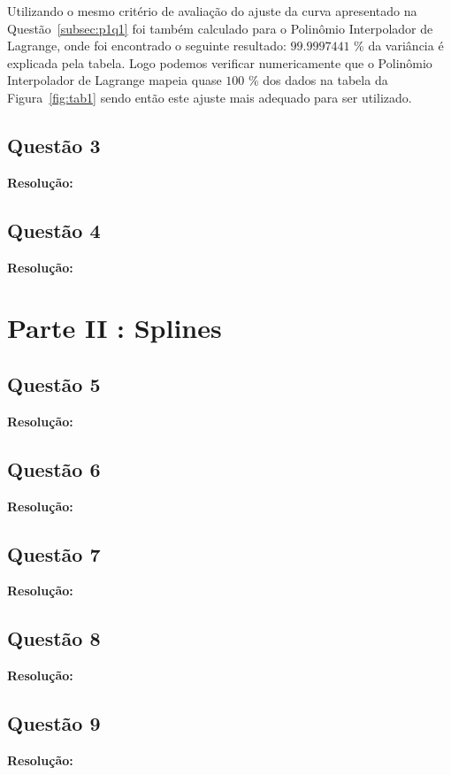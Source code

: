 \documentclass[12pt]{article}
\begin{document}
Utilizando o mesmo critério de avaliação do ajuste da curva apresentado na Questão~\ref{subsec:p1q1} foi também calculado para o Polinômio Interpolador de Lagrange, onde foi encontrado o seguinte resultado: $99.9997441$ \% da variância é explicada pela tabela. Logo podemos verificar numericamente que o Polinômio Interpolador de Lagrange mapeia quase $100$ \% dos dados na tabela da Figura~\ref{fig:tab1} sendo então este ajuste mais adequado para ser utilizado.

\subsection{Questão 3}
\label{subsec:p1q3}

\textbf{Resolução:}

\subsection{Questão 4}
\label{subsec:p1q4}

\textbf{Resolução:}

\section{Parte II : Splines}
\label{sec:parte2}

\subsection{Questão 5}
\label{subsec:p2q5}

\textbf{Resolução:}

\subsection{Questão 6}
\label{subsec:p2q6}

\textbf{Resolução:}

\subsection{Questão 7}
\label{subsec:p2q7}

\textbf{Resolução:}

\subsection{Questão 8}
\label{subsec:p2q8}

\textbf{Resolução:}

\subsection{Questão 9}
\label{subsec:p2q9}

\textbf{Resolução:}
\end{document}
